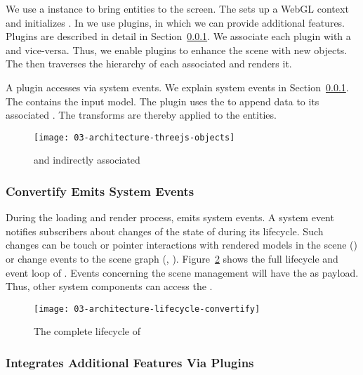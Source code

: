 \documentclass[../../ClassicThesis.tex]{subfiles}
\begin{document}
We use a  instance to bring {\threejs} entities to the
screen. The  sets up a WebGL context and initializes
{\threejs}. In {\convertify} we use plugins, in which we can provide
additional features. Plugins are described in detail in
Section~\ref{convertify-emits-events}. We associate each plugin with a
 and vice-versa. Thus, we enable plugins to
enhance the scene with new objects. The  then
traverses the hierarchy of each associated  and
renders it.

A plugin accesses  via system events. We explain system
events in Section~\ref{convertify-emits-events}. The 
contains the input model. The plugin uses the  to append
data to its associated . The 
transforms are thereby applied to the {\threejs} entities.


\begin{figure}[h]
  \centering
  \texttt{[image: 03-architecture-threejs-objects]}
  \caption{ and indirectly associated }
  \label{fig:nodes-and-three}
\end{figure}

\subsubsection{Convertify Emits System Events}
\label{convertify-emits-events}

During the loading and render process, {\convertify} emits system
events. A system event notifies subscribers about changes of the state
of {\convertify} during its lifecycle. Such changes can be touch or
pointer interactions with rendered models in the scene
() or change events to the scene graph
(, ). Figure~\ref{fig:lifecycle} shows
the full lifecycle and event loop of {\convertify}. Events concerning
the scene management will have the  as payload. Thus,
other system components can access the .

\begin{figure}[h]
  \centering
  \texttt{[image: 03-architecture-lifecycle-convertify]}
  \caption{The complete lifecycle of {\convertify}}
  \label{fig:lifecycle}
\end{figure}

\subsubsection{{\convertify} Integrates Additional Features
  Via Plugins}
\end{document}
